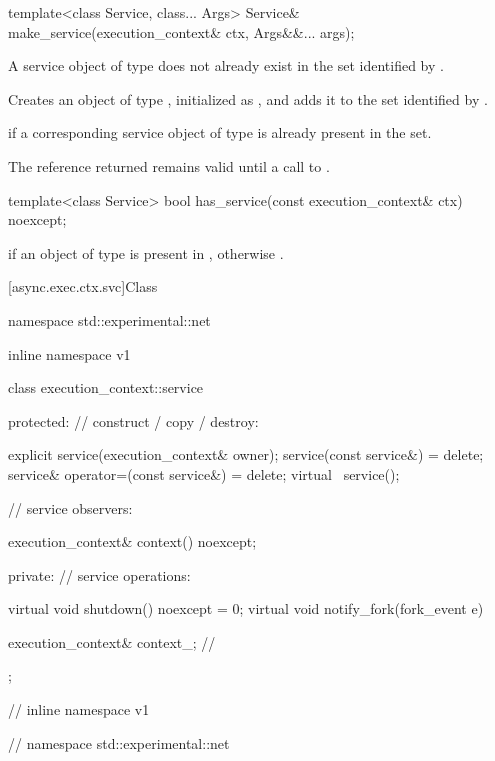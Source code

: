 %
\begin{itemdecl}
template<class Service, class... Args> Service&
  make_service(execution_context& ctx, Args&&... args);
\end{itemdecl}

\begin{itemdescr}
\pnum
\requires A service object of type  does not already exist in the  set identified by .

\pnum
\effects Creates an object of type , initialized as , and adds it to the  set identified by .

\pnum
\throws {} if a corresponding service object of type  is already present in the set.

\pnum
\remarks The reference returned remains valid until a call to .
\end{itemdescr}

%
\begin{itemdecl}
template<class Service> bool has_service(const execution_context& ctx) noexcept;
\end{itemdecl}

\begin{itemdescr}
\pnum
\returns {} if an object of type  is present in , otherwise .
\end{itemdescr}




[async.exec.ctx.svc]{Class }

%
\begin{codeblock}
namespace std::experimental::net {
inline namespace v1 {

  class execution_context::service
  {
  protected:
    // construct / copy / destroy:

    explicit service(execution_context& owner);
    service(const service&) = delete;
    service& operator=(const service&) = delete;
    virtual ~service();

    // service observers:

    execution_context& context() noexcept;

  private:
    // service operations:

    virtual void shutdown() noexcept = 0;
    virtual void notify_fork(fork_event e) {}

    execution_context& context_; // \expos
  };

} // inline namespace v1
} // namespace std::experimental::net
\end{codeblock}


